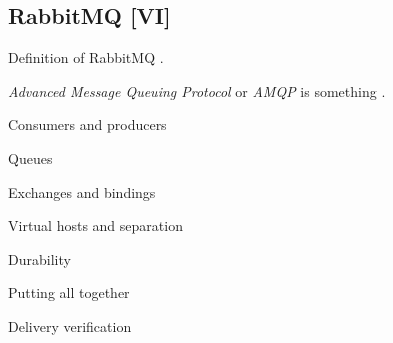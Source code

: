 \subsection{RabbitMQ [VI]}

Definition of RabbitMQ \cite{RabbitMQ, AlvaroWilliams2012}.

\textit{Advanced Message Queuing Protocol}  or \textit{AMQP} is something \cite{AMQP2011}.

Consumers and producers

Queues

Exchanges and bindings

Virtual hosts and separation

Durability

Putting all together

Delivery verification